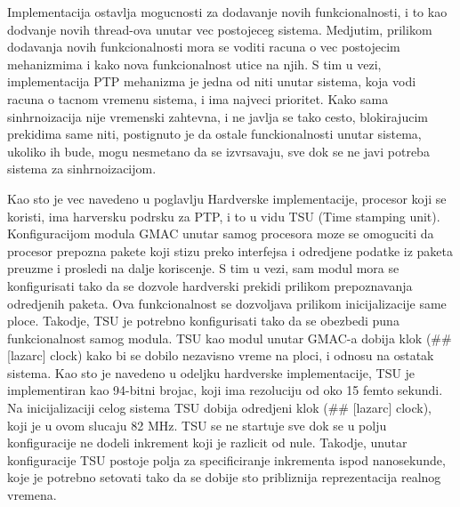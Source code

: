 \documentclass[a4paper,12pt, master]{etf}
\begin{document}
    Implementacija ostavlja mogucnosti za dodavanje novih funkcionalnosti, i to kao dodvanje novih thread-ova 
    unutar vec postojeceg sistema. Medjutim, prilikom dodavanja novih funkcionalnosti mora se voditi racuna o 
    vec postojecim mehanizmima i kako nova funkcionalnost utice na njih. S tim u vezi, implementacija PTP 
    mehanizma je jedna od niti unutar sistema, koja vodi racuna o tacnom vremenu sistema, i ima najveci 
    prioritet. Kako sama sinhrnoizacija nije vremenski zahtevna, i ne javlja se tako cesto, blokirajucim 
    prekidima same niti, postignuto je da ostale funckionalnosti unutar sistema, ukoliko ih bude, mogu 
    nesmetano da se izvrsavaju, sve dok se ne javi potreba sistema za sinhrnoizacijom. 

    Kao sto je vec navedeno u poglavlju Hardverske implementacije, procesor koji se koristi, ima harversku 
    podrsku za PTP, i to u vidu TSU (Time stamping unit). Konfiguracijom modula GMAC unutar samog procesora 
    moze se omoguciti da procesor prepozna pakete koji stizu preko interfejsa i odredjene podatke iz paketa 
    preuzme i prosledi na dalje koriscenje. S tim u vezi, sam modul mora se konfigurisati tako da se dozvole 
    hardverski prekidi prilikom prepoznavanja odredjenih paketa. Ova funkcionalnost se dozvoljava prilikom 
    inicijalizacije same ploce. Takodje, TSU je potrebno konfigurisati tako da se obezbedi puna 
    funkcionalnost samog modula. TSU kao modul unutar GMAC-a dobija klok (\#\# [lazarc] clock) kako bi se 
    dobilo nezavisno vreme na ploci, i odnosu na ostatak sistema. Kao sto je navedeno u odeljku hardverske 
    implementacije, TSU je implementiran kao 94-bitni brojac, koji ima rezoluciju od oko 15 femto sekundi. Na 
    inicijalizaciji celog sistema TSU dobija odredjeni klok (\#\# [lazarc] clock), koji je u ovom slucaju 82 
    MHz. TSU se ne startuje sve dok se u polju konfiguracije ne dodeli inkrement koji je razlicit od nule. 
    Takodje, unutar konfiguracije TSU postoje polja za specificiranje inkrementa ispod nanosekunde, koje je 
    potrebno setovati tako da se dobije sto pribliznija reprezentacija realnog vremena. 
    
\end{document}
